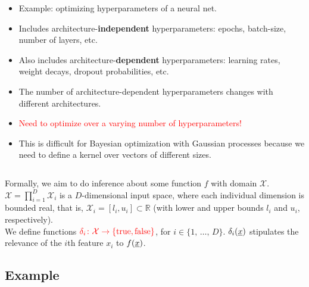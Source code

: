\documentclass[landscape,a0b,final,a4resizeable]{include/a0poster}
\newcommand{\vect}[1]{\underline{\smash{#1}}}
\renewcommand{\v}[1]{\vect{#1}}
\newcommand{\reals}{\mathds{R}}
\newcommand{\sX}{\mathcal{X}}
\begin{document}
\begin{poster}
\begin{multicols}{3}
\begin{minipage}[c]{0.64\columnwidth}
\begin{itemize}
	\item Example: optimizing hyperparameters of a neural net.
	\item Includes architecture-\textbf{independent} hyperparameters: epochs, batch-size, number of layers, etc.
	\item Also includes architecture-\textbf{dependent} hyperparameters: learning rates, weight decays, dropout probabilities, etc.
	\item The number of architecture-dependent hyperparameters changes with different architectures.
	\item \textcolor{red} {Need to optimize over a varying number of hyperparameters!}
	\item This is difficult for Bayesian optimization with Gaussian processes because we need to define a kernel over vectors of different sizes.
\end{itemize}
\end{minipage}
\begin{minipage}[c]{0.35\columnwidth}
\begin{centering}
\begin{tabular}{c}
 \\
\end{tabular}
\end{centering}
\end{minipage}

\vspace{0.5in}

Formally, we aim to do inference about some function $f$ with domain 
 $\sX$. $\sX = \prod_{i=1}^D \sX_i$ is a $D$-dimensional input space, where each individual dimension is bounded real, that is, $\sX_i = [l_i, u_i] \subset \reals$ (with lower and upper bounds $l_i$ and $u_i$, respectively).\\
We define functions $\textcolor{red}{\delta_i\colon \sX\to \{\text{true}, \text{false}\}}$, for $i \in \{1,\,\ldots,\,D\}$. $\delta_i(\v{x})$ stipulates the relevance of the $i$th feature $x_i$ to 
  $f(\v{x})$.



\subsection*{Example}
\vspace{-0.05in}


\end{multicols}
\end{poster}
\end{document}
